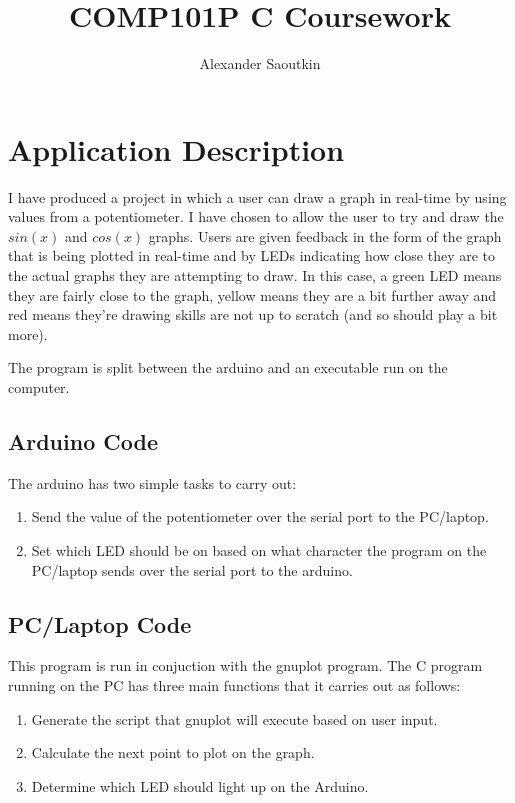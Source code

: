 \documentclass{article}
\title{COMP101P C Coursework}
\author{Alexander Saoutkin}
\begin{document}
\maketitle
\newpage
\section{Application Description}
I have produced a project in which a user can draw a graph in real-time by
using values from a potentiometer. 
I have chosen to allow the user to try and draw the $ sin(x) $ and $ cos(x) $
graphs. Users are given feedback in the form of the graph that is being plotted
in real-time and by LEDs indicating how close they are to the actual graphs
they are attempting to draw. In this case, a green LED means they are fairly
close to the graph, yellow means they are a bit further away and red means 
they're drawing skills are not up to scratch (and so should play a bit more).

The program is split between the arduino and an executable run on the computer.
\subsection{Arduino Code}
The arduino has two simple tasks to carry out:
\begin{enumerate}
\item Send the value of the potentiometer over the serial port to the PC/laptop.
\item Set which LED should be on based on what character the program on the 
PC/laptop sends over the serial port to the arduino.
\end{enumerate}
\subsection{PC/Laptop Code}
This program is run in conjuction with the gnuplot program. The C program
running on the PC has three main functions that it carries out as follows:
\begin{enumerate}
\item Generate the script that gnuplot will execute based on user input.
\item Calculate the next point to plot on the graph.
\item Determine which LED should light up on the Arduino.
\end{enumerate}
\end{document}
